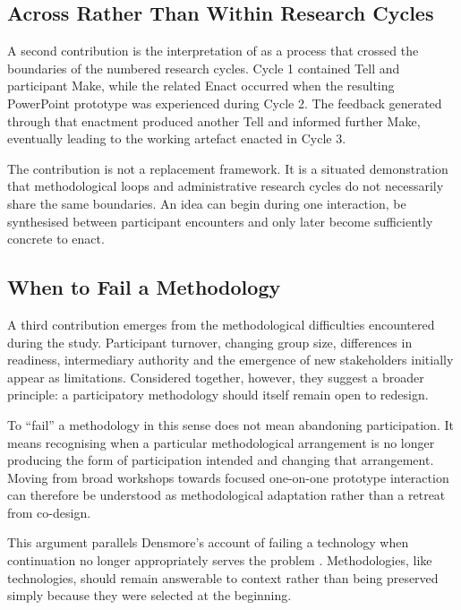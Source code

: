 \subsection{\texorpdfstring{\tme}{Tell-Make-Enact} Across Rather Than Within Research Cycles}

A second contribution is the interpretation of \tme{} as a process that crossed the boundaries of the numbered research cycles. Cycle 1 contained Tell and participant Make, while the related Enact occurred when the resulting PowerPoint prototype was experienced during Cycle 2. The feedback generated through that enactment produced another Tell and informed further Make, eventually leading to the working artefact enacted in Cycle 3.

The contribution is not a replacement \tme{} framework. It is a situated demonstration that methodological loops and administrative research cycles do not necessarily share the same boundaries. An idea can begin during one interaction, be synthesised between participant encounters and only later become sufficiently concrete to enact.


\subsection{When to Fail a Methodology}

A third contribution emerges from the methodological difficulties encountered during the study. Participant turnover, changing group size, differences in readiness, intermediary authority and the emergence of new stakeholders initially appear as limitations. Considered together, however, they suggest a broader principle: a participatory methodology should itself remain open to redesign.

To ``fail'' a methodology in this sense does not mean abandoning participation. It means recognising when a particular methodological arrangement is no longer producing the form of participation intended and changing that arrangement. Moving from broad workshops towards focused one-on-one prototype interaction can therefore be understood as methodological adaptation rather than a retreat from co-design.

This argument parallels Densmore's account of failing a technology when continuation no longer appropriately serves the problem \cite{densmore2012}. Methodologies, like technologies, should remain answerable to context rather than being preserved simply because they were selected at the beginning.



